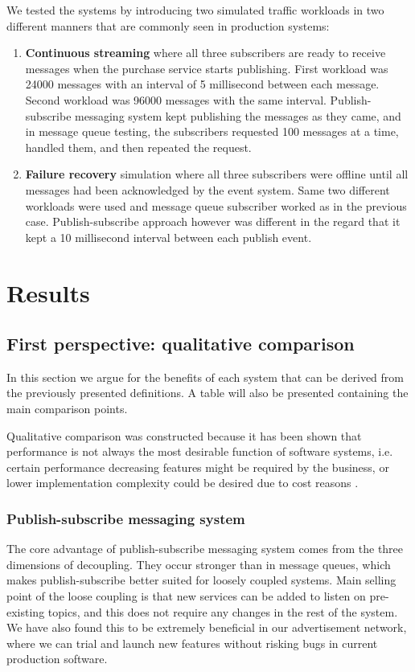 \documentclass[conference]{IEEEtran}
\begin{document}
We tested the systems by introducing two simulated traffic workloads in two different manners that are commonly seen in production systems:
\begin{enumerate}
    \item \textbf{Continuous streaming} where all three subscribers are ready to receive messages when the purchase service starts publishing. First workload was 24000 messages with an interval of 5 millisecond between each message. Second workload was 96000 messages with the same interval. Publish-subscribe messaging system kept publishing the messages as they came, and in message queue testing, the subscribers requested 100 messages at a time, handled them, and then repeated the request.
    \item \textbf{Failure recovery} simulation where all three subscribers were offline until all messages had been acknowledged by the event system. Same two different workloads were used and message queue subscriber worked as in the previous case. Publish-subscribe approach however was different in the regard that it kept a 10 millisecond interval between each publish event.
\end{enumerate}

\section{Results}
\subsection{First perspective: qualitative comparison}
In this section we argue for the benefits of each system that can be derived from the previously presented definitions. A table will also be presented containing the main comparison points.

Qualitative comparison was constructed because it has been shown that performance is not always the most desirable function of software systems, i.e. certain performance decreasing features might be required by the business, or lower implementation complexity could be desired due to cost reasons \cite{softquality}.
\\

\subsubsection{Publish-subscribe messaging system}
The core advantage of publish-subscribe messaging system comes from the three dimensions of decoupling. They occur stronger than in message queues, which makes publish-subscribe better suited for loosely coupled systems. Main selling point of the loose coupling is that new services can be added to listen on pre-existing topics, and this does not require any changes in the rest of the system. We have also found this to be extremely beneficial in our advertisement network, where we can trial and launch new features without risking bugs in current production software. 
\end{document}
